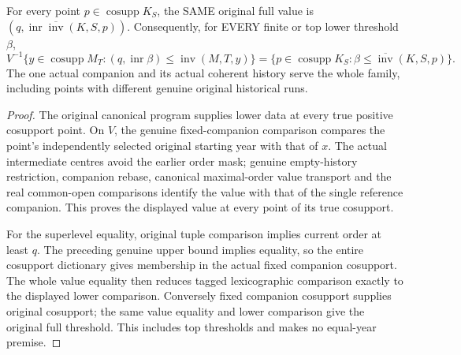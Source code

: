 \begin{theorem}
\label{hir:original-frozen-companion-whole-value-dictionary}
\leanok
{}
For every point $p\in\operatorname{cosupp}K_S$, the SAME original full value
is $(q,\operatorname{inr}\overline{\operatorname{inv}}(K,S,p))$.
Consequently, for EVERY finite or top lower threshold $\beta$,
\[
 V^{-1}\{y\in\operatorname{cosupp}M_T:
        (q,\operatorname{inr}\beta)\le\operatorname{inv}(M,T,y)\}
 =\{p\in\operatorname{cosupp}K_S:
        \beta\le\overline{\operatorname{inv}}(K,S,p)\}.
\]
The one actual companion and its actual coherent history serve the whole
family, including points with different genuine original historical runs.
\end{theorem}
\begin{proof}
The original canonical program supplies lower data at every true positive
cosupport point. On $V$, the genuine fixed-companion comparison compares
the point's independently selected original starting year with that of $x$.
The actual intermediate centres avoid the earlier order mask; genuine
empty-history restriction, companion rebase, canonical maximal-order value
transport and the real common-open comparisons identify the value with
that of the single reference companion. This proves the displayed value
at every point of its true cosupport.

For the superlevel equality, original tuple comparison implies current
order at least $q$. The preceding genuine upper bound implies equality,
so the entire cosupport dictionary gives membership in the actual fixed
companion cosupport. The whole value equality then reduces tagged
lexicographic comparison exactly to the displayed lower comparison.
Conversely fixed companion cosupport supplies original cosupport; the
same value equality and lower comparison give the original full
threshold. This includes top thresholds and makes no equal-year premise.
\end{proof}

